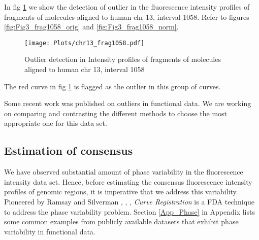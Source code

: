 In fig \ref{fig:Fig3_frag1058_outlier} we show the detection of outlier in the fluorescence intensity profiles of fragments of molecules aligned to human chr 13, interval 1058. Refer to figures \ref{fig:Fig3_frag1058_orig} and \ref{fig:Fig3_frag1058_norm}. 
\begin{figure}[H]
\begin{center}
\texttt{[image: Plots/chr13\_frag1058.pdf]}
\end{center}
\caption{Outlier detection in Intensity profiles of fragments of molecules aligned to human chr 13, interval 1058}
\label{fig:Fig3_frag1058_outlier}
\end{figure}
The red curve in fig \ref{fig:Fig3_frag1058_outlier} is flagged as the outlier in this group of curves.
\begin{tcolorbox}[colback=green!5,colframe=green!40!black,title=Work in progress] %
Some recent work was published on outliers in functional data. We are working on comparing and contrasting the different methods to choose the most appropriate one for this data set.
\end{tcolorbox}

\subsection{Estimation of consensus} \label{Ch3_Regist}

We have observed substantial amount of phase variability in the fluorescence intensity data set. Hence, before estimating the consensus fluorescence intensity profiles of genomic regions, it is imperative that we address this variability. Pioneered by Ramsay and Silverman \cite{Ramsay_2006_Functional}, \cite{Ramsay_Li_1998_JRSSB}, \cite{Ramsay_etal_2009_Functional_R}, {\emph{Curve Registration}} is a FDA technique to address the phase variability problem. Section \ref{App_Phase} in Appendix lists some common examples from publicly available datasets that exhibit phase variability in functional data.


